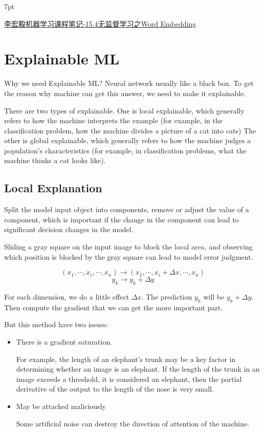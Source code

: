 \documentclass{article}
\newenvironment{quoteblock}{%
\def\FrameCommand{%
\hspace{1pt}%
{\color{DarkBlue}\vrule width 2pt}%
{\color{formalshade}\vrule width 4pt}%
\colorbox{formalshade}%
}%
\MakeFramed{\advance\hsize-\width\FrameRestore}%
\noindent\hspace{-4.55pt}%
\begin{adjustwidth}{}{7pt}%
\vspace{2pt}\vspace{2pt}%
}
{%
\vspace{2pt}\end{adjustwidth}\endMakeFramed%
}
\newenvironment{propblock}[1][\textbf{Proposition}]{\begin{tcolorbox}
[title = \textbf{#1}, colback=Salmon!20, colframe=Salmon!90!Black]}{\end{tcolorbox}}
\begin{document}
\begin{quoteblock}
    \href{https://zhuanlan.zhihu.com/p/396517227}{李宏毅机器学习课程笔记-15.4无监督学习之Word Embedding}
\end{quoteblock}

\section{Explainable ML}

Why we need Explainable ML? Neural network usually like a black box. To get the reason why machine can get this answer, we need to make it explainable.

There are two types of explainable. One is local explainable, which generally refers to how the machine interprets the example (for example, in the classification problem, how the machine divides a picture of a cat into cats) The other is global explainable, which generally refers to how the machine judges a population's characteristics (for example, in classification problems, what the machine thinks a cat looks like).

\subsection{Local Explanation}

Split the model input object into components, remove or adjust the value of a component, which is important if the change in the component can lead to significant decision changes in the model.


\begin{propblock}[Detection Based on Sliding Window]
    Sliding a gray square on the input image to block the local area, and observing which position is blocked by the gray square can lead to model error judgment.
\end{propblock}

\begin{propblock}[Detection Based on Gradient]
    $$
    (x_1,\cdots,x_i,\cdots,x_n)\to(x_1,\cdots,x_i+\Delta x,\cdots,x_n)
    $$
    $$
    y_k \to y_k + \Delta y
    $$

    For each dimension, we do a little effect $\Delta x$. The prediction $y_k$ will be $y_k + \Delta y$. Then compute the gradient that we can get the more important part.
\end{propblock}

But this method have two issues:

\begin{itemize}
    \item There is a gradient saturation.
    
    For example, the length of an elephant's trunk may be a key factor in determining whether an image is an elephant. If the length of the trunk in an image exceeds a threshold, it is considered an elephant, then the partial derivative of the output to the length of the nose is very small.

    \item May be attacked maliciously

    Some artificial noise can destroy the direction of attention of the machine.
\end{itemize}
\end{document}
